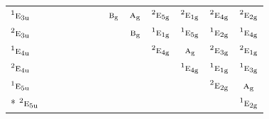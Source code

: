\documentclass[10pt,a4paper]{article}
\numberwithin{equation}{section}
\newcommand{\irr}[1]{\text{\normalfont\scshape #1}}
\newcommand{\conjpair}[1]{{}^{#1}}
\newcommand{\ptag}[1]{\mathrm{#1}}
\begin{document}
{\begin{longtable}{@{}lcccccccccccc@{}}
$\conjpair{1}\irr{e}_{3\ptag{u}}$ &  &  &  &  &  &  & $\irr{b}_{\ptag{g}}$ & $\irr{a}_{\ptag{g}}$ & $\conjpair{2}\irr{e}_{5\ptag{g}}$ & $\conjpair{2}\irr{e}_{1\ptag{g}}$ & $\conjpair{2}\irr{e}_{4\ptag{g}}$ & $\conjpair{2}\irr{e}_{2\ptag{g}}$\\
$\conjpair{2}\irr{e}_{3\ptag{u}}$ &  &  &  &  &  &  &  & $\irr{b}_{\ptag{g}}$ & $\conjpair{1}\irr{e}_{1\ptag{g}}$ & $\conjpair{1}\irr{e}_{5\ptag{g}}$ & $\conjpair{1}\irr{e}_{2\ptag{g}}$ & $\conjpair{1}\irr{e}_{4\ptag{g}}$\\
$\conjpair{1}\irr{e}_{4\ptag{u}}$ &  &  &  &  &  &  &  &  & $\conjpair{2}\irr{e}_{4\ptag{g}}$ & $\irr{a}_{\ptag{g}}$ & $\conjpair{2}\irr{e}_{3\ptag{g}}$ & $\conjpair{2}\irr{e}_{1\ptag{g}}$\\
$\conjpair{2}\irr{e}_{4\ptag{u}}$ &  &  &  &  &  &  &  &  &  & $\conjpair{1}\irr{e}_{4\ptag{g}}$ & $\conjpair{1}\irr{e}_{1\ptag{g}}$ & $\conjpair{1}\irr{e}_{3\ptag{g}}$\\
$\conjpair{1}\irr{e}_{5\ptag{u}}$ &  &  &  &  &  &  &  &  &  &  & $\conjpair{2}\irr{e}_{2\ptag{g}}$ & $\irr{a}_{\ptag{g}}$\\*
$\conjpair{2}\irr{e}_{5\ptag{u}}$ &  &  &  &  &  &  &  &  &  &  &  & $\conjpair{1}\irr{e}_{2\ptag{g}}$\\
\bottomrule\end{longtable}}
\end{document}
